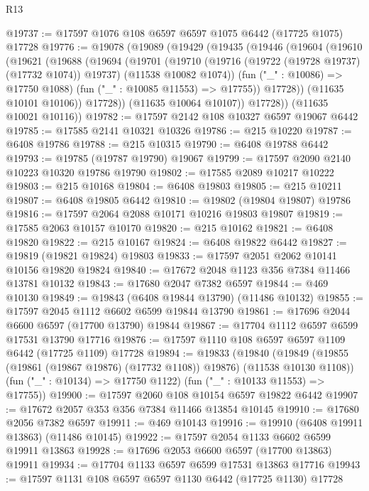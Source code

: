 \begin{lexlean}{R13}
\begin{coremodule}
@19737 := @17597 @1076 @108 @6597 @6597 @1075 @6442 (@17725 @1075) @17728
@19776 := @19078
    (@19089
      (@19429
        (@19435
          (@19446
            (@19604
              (@19610
                (@19621
                  (@19688
                    (@19694
                      (@19701
                        (@19710
                          (@19716 (@19722 (@19728 @19737) (@17732 @1074)) @19737)
                          (@11538 @10082 @1074))
                        (fun ("_" : @10086) => @17750 @1088)
                        (fun ("_" : @10085 @11553) => @17755))
                      @17728))
                  (@11635 @10101 @10106))
                @17728))
            (@11635 @10064 @10107))
          @17728))
      (@11635 @10021 @10116))
@19782 := @17597 @2142 @108 @10327 @6597 @19067 @6442
@19785 := @17585 @2141 @10321 @10326
@19786 := @215 @10220
@19787 := @6408 @19786
@19788 := @215 @10315
@19790 := @6408 @19788 @6442
@19793 := @19785 (@19787 @19790) @19067
@19799 := @17597 @2090 @2140 @10223 @10320 @19786 @19790
@19802 := @17585 @2089 @10217 @10222
@19803 := @215 @10168
@19804 := @6408 @19803
@19805 := @215 @10211
@19807 := @6408 @19805 @6442
@19810 := @19802 (@19804 @19807) @19786
@19816 := @17597 @2064 @2088 @10171 @10216 @19803 @19807
@19819 := @17585 @2063 @10157 @10170
@19820 := @215 @10162
@19821 := @6408 @19820
@19822 := @215 @10167
@19824 := @6408 @19822 @6442
@19827 := @19819 (@19821 @19824) @19803
@19833 := @17597 @2051 @2062 @10141 @10156 @19820 @19824
@19840 := @17672 @2048 @1123 @356 @7384 @11466 @13781 @10132
@19843 := @17680 @2047 @7382 @6597
@19844 := @469 @10130
@19849 := @19843 (@6408 @19844 @13790) (@11486 @10132)
@19855 := @17597 @2045 @1112 @6602 @6599 @19844 @13790
@19861 := @17696 @2044 @6600 @6597 (@17700 @13790) @19844
@19867 := @17704 @1112 @6597 @6599 @17531 @13790 @17716
@19876 := @17597 @1110 @108 @6597 @6597 @1109 @6442 (@17725 @1109) @17728
@19894 := @19833
    (@19840
      (@19849 (@19855 (@19861 (@19867 @19876) (@17732 @1108)) @19876) (@11538 @10130 @1108))
      (fun ("_" : @10134) => @17750 @1122)
      (fun ("_" : @10133 @11553) => @17755))
@19900 := @17597 @2060 @108 @10154 @6597 @19822 @6442
@19907 := @17672 @2057 @353 @356 @7384 @11466 @13854 @10145
@19910 := @17680 @2056 @7382 @6597
@19911 := @469 @10143
@19916 := @19910 (@6408 @19911 @13863) (@11486 @10145)
@19922 := @17597 @2054 @1133 @6602 @6599 @19911 @13863
@19928 := @17696 @2053 @6600 @6597 (@17700 @13863) @19911
@19934 := @17704 @1133 @6597 @6599 @17531 @13863 @17716
@19943 := @17597 @1131 @108 @6597 @6597 @1130 @6442 (@17725 @1130) @17728

\end{coremodule}
\end{lexlean}

